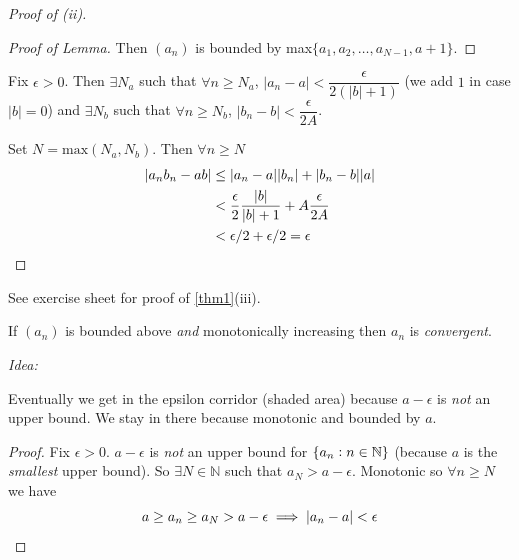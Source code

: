 \documentclass[10pt,twoside]{scrartcl}
\begin{document}
\begin{proof}[Proof of (ii)]
\begin{proof}[Proof of Lemma]
Then $(a_n)$ is bounded by max$\{a_1,a_2,\dots,a_{N-1},a+1\}$.
\end{proof}


Fix $\epsilon >0$. Then $\exists N_a$ such that $\forall n \geq N_a$, $|a_n - a| < \dfrac{\epsilon}{2(|b| + 1)}$ (we add $1$ in case $|b| = 0$)
and $\exists N_b$ such that $\forall n \geq N_b$, $|b_n - b| < \dfrac{\epsilon}{2A}$. 

Set $N = \text{max}(N_a,N_b)$. Then $\forall n \geq N$
\begin{align*}|a_nb_n -ab| &\leq |a_n-a||b_n| + |b_n-b||a|\\ 
&< \frac{\epsilon}{2}\frac{|b|}{|b|+1} + A\frac{\epsilon}{2A}\\ 
& < \epsilon/2 + \epsilon/2 = \epsilon\qedhere	
\end{align*}
\end{proof}

See exercise sheet for proof of \ref{thm1}(iii).\\

\begin{theorem}
If $(a_n)$ is bounded above \emph{and} monotonically increasing then $a_n$ is \emph{convergent}.
\end{theorem}

\emph{Idea:} 
\begin{center}
\end{center}
Eventually we get in the epsilon corridor (shaded area) because $a-\epsilon$ is \emph{not} an upper bound. We stay in there because monotonic and bounded by $a$.
\begin{proof}
Fix $\epsilon >0$. $a-\epsilon$ is \emph{not} an upper bound for $\{a_n : n \in\mathbb{N}\}$ (because $a$ is the \emph{smallest} upper bound). So $\exists N \in \mathbb{N}$ such that $a_N > a-\epsilon$. Monotonic so $\forall n \geq N$ we have \[a\geq a_n\geq a_N > a-\epsilon \implies |a_n - a| < \epsilon\qedhere\]	
\end{proof}~
\end{document}
